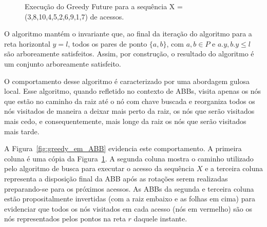 \begin{figure}
    \caption{Execução do Greedy Future para a sequência X = (3,8,10,4,5,2,6,9,1,7) de acessos.}
\label{fig:GreedyFuture-funcionamento}
\end{figure}

O algoritmo mantém o invariante que, ao final da iteração do algoritmo para a reta horizontal $y = l$, todos os pares de ponto $\{a,b\}$, com $a,b \in P$ e $a.y, b.y \leq l$ são arboreamente satisfeitos. Assim, por construção, o resultado do algoritmo é um conjunto arboreamente satisfeito.

O comportamento desse algoritmo é caracterizado por uma abordagem gulosa local. Esse algoritmo, quando refletido no contexto de ABBs, visita apenas os nós que estão no caminho da raiz até o nó com chave buscada e reorganiza todos os nós visitados de maneira a deixar mais perto da raiz, os nós que serão visitados mais cedo, e consequentemente, mais longe da raiz os nós que serão visitados mais tarde. 

A Figura~\ref{fig:greedy_em_ABB} evidencia este comportamento. A primeira coluna é uma cópia da Figura~\ref{fig:GreedyFuture-funcionamento}. A segunda coluna mostra o caminho utilizado pelo algoritmo de busca para executar o acesso da sequência $X$ e a terceira coluna representa a disposição final da ABB após as rotações serem realizadas preparando-se para os próximos acessos. As ABBs da segunda e terceira coluna estão propositalmente invertidas (com a raiz embaixo e as folhas em cima) para evidenciar que todos os nós visitados em cada acesso (nós em vermelho) são os nós representados pelos pontos na reta $r$ daquele instante.

